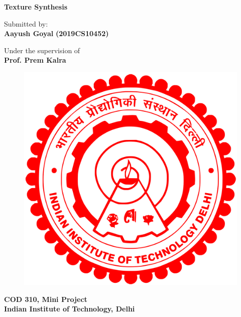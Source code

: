 \documentclass[12pt,a4paper]{report}
\begin{document}
\begin{center}
{\Huge \textbf{Texture Synthesis}}\\
\vspace{0.5cm}

\vspace{1 cm}
{\large {Submitted by:}} \\

{\Large \textbf{Aayush Goyal}}
{\Large \textbf{(2019CS10452)}}

\vspace{0.2cm}
\vspace{1 cm}
{\large {Under the supervision of}}\\

{\Large \textbf{Prof. Prem Kalra}}\\

\end{center}

\vspace{6pt}
\begin{center}
\begin{figure}[H]
    \centering
    \includegraphics[scale=0.1]{pics/iitd.png}
    \label{fig:IITD logo}
\end{figure}
{\Large \textbf{COD 310, Mini Project}}\\

{\large \textbf{Indian Institute of Technology, Delhi}}\\

\end{center}
\end{document}
